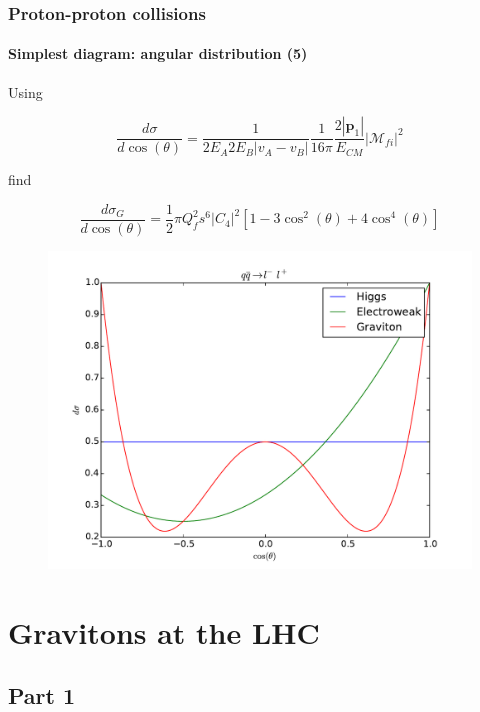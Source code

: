 \documentclass[10pt]{beamer}
\begin{document}
	\begin{frame}
		\frametitle{Proton-proton collisions}
		\framesubtitle{Simplest diagram: angular distribution (5)}
		
		Using
		
		\begin{equation}
		\frac{d\sigma}{d\cos(\theta)} = \frac{1}{2E_A2E_B|v_A-v_B|}\frac{1}{16\pi}\frac{2|\bm{p}_1|}{E_{CM}}|\mathcal{M}_{fi}|^2
		\end{equation}
		
		find
		
		\begin{equation}
		\frac{d\sigma_{G}}{d\cos(\theta)} = \frac{1}{2}\pi Q_f^2s^6|C_4|^2\left[1-3\cos^2(\theta) + 4\cos^4(\theta)\right]
		\end{equation}
		
		
		\begin{figure}[H]
			\centering
			\includegraphics[scale=0.2]{../angDist.pdf}
		\end{figure}
	\end{frame}
	
	\section{Gravitons at the LHC}
	\subsection{Part 1}
	
\end{document}
